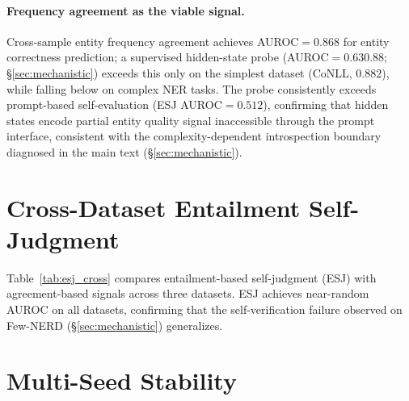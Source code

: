 \paragraph{Frequency agreement as the viable signal.}
Cross-sample entity frequency agreement achieves AUROC${=}0.868$ for entity correctness prediction; a supervised hidden-state probe (AUROC${=}0.63$\textendash$0.88$; \S\ref{sec:mechanistic}) exceeds this only on the simplest dataset (CoNLL, $0.882$), while falling below on complex NER tasks.
The probe consistently exceeds prompt-based self-evaluation (ESJ AUROC${=}0.512$), confirming that hidden states encode partial entity quality signal inaccessible through the prompt interface, consistent with the complexity-dependent introspection boundary diagnosed in the main text (\S\ref{sec:mechanistic}).

\section{Cross-Dataset Entailment Self-Judgment}\label{app:esj}

Table~\ref{tab:esj_cross} compares entailment-based self-judgment (ESJ) with agreement-based signals across three datasets.
ESJ achieves near-random AUROC on all datasets, confirming that the self-verification failure observed on Few-NERD (\S\ref{sec:mechanistic}) generalizes.

\begin{table}[h]
\small
\centering
\caption{Entity-level self-verification: ESJ vs.\ agreement-based signals across datasets (Qwen3-8B, $N{=}8$). ESJ AUROC is indistinguishable from chance on all datasets.}
\label{tab:esj_cross}
\end{table}

\section{Multi-Seed Stability}\label{app:multiseed}


